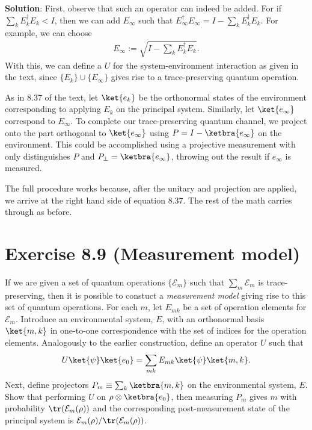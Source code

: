 \documentclass{book}
\begin{document}
    \textbf{Solution}: First, observe that such an operator can indeed be added. For if $\sum_k E_k^\dagger E_k < I$, then we can add $E_\infty$ such that $E_\infty^\dagger E_\infty = I - \sum_k E_k^\dagger E_k$. For example, we can choose \begin{align}
        E_\infty := \sqrt{I- \sum_k E_k^\dagger E_k}. 
    \end{align}
    With this, we can define a $U$ for the system-environment interaction as given in the text, since $\{E_k\} \cup \{E_\infty\}$ gives rise to a trace-preserving quantum operation.

    As in 8.37 of the text, let $\ket{e_k}$ be the orthonormal states of the environment corresponding to applying $E_k$ on the principal system. Similarly, let $\ket{e_\infty}$ correspond to $E_\infty$. To complete our trace-preserving quantum channel, we project onto the part orthogonal to $\ket{e_\infty}$ using $P = I - \ketbra{e_\infty}$ on the environment. This could be accomplished using a projective measurement with only distinguishes $P$ and $P_\perp = \ketbra{e_\infty}$, throwing out the result if $e_\infty$ is measured. 

    The full procedure works because, after the unitary and projection are applied, we arrive at the right hand side of equation 8.37. The rest of the math carries through as before.

\section*{Exercise 8.9 (Measurement model)}
    If we are given a set of quantum operations $\{\mathcal{E}_m\}$ such that $\sum_m \mathcal{E}_m$ is trace-preserving, then it is possible to constuct a \emph{measurement model} giving rise to this set of quantum operations. For each $m$, let $E_{mk}$ be a set of operation elements for $\mathcal{E}_m$. Introduce an environmental system, $E$, with an orthonormal basis $\ket{m, k}$ in one-to-one correspondence with the set of indices for the operation elements. Analogously to the earlier construction, define an operator $U$ such that 
    \begin{align}
        U\ket{\psi}\ket{e_0} = \sum_{mk} E_{mk}\ket{\psi}\ket{m,k}.
    \end{align}
    Next, define projectors $P_m \equiv \sum_k \ketbra{m,k}$ on the environmental system, $E$. Show that performing $U$ on $\rho \otimes \ketbra{e_0}$, then measuring $P_m$ gives $m$ with probability $\tr(\mathcal{E}_m(\rho))$ and the corresponding post-measurement state of the principal system is $\mathcal{E}_m(\rho)/\tr(\mathcal{E}_m(\rho))$.
\end{document}
